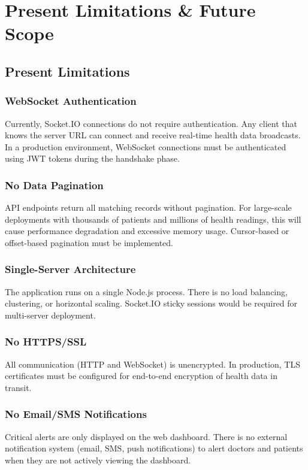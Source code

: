 \chapter{Present Limitations \& Future Scope}

\section{Present Limitations}

\subsection{WebSocket Authentication}
Currently, Socket.IO connections do not require authentication. Any client that knows the server URL can connect and receive real-time health data broadcasts. In a production environment, WebSocket connections must be authenticated using JWT tokens during the handshake phase.

\subsection{No Data Pagination}
API endpoints return all matching records without pagination. For large-scale deployments with thousands of patients and millions of health readings, this will cause performance degradation and excessive memory usage. Cursor-based or offset-based pagination must be implemented.

\subsection{Single-Server Architecture}
The application runs on a single Node.js process. There is no load balancing, clustering, or horizontal scaling. Socket.IO sticky sessions would be required for multi-server deployment.

\subsection{No HTTPS/SSL}
All communication (HTTP and WebSocket) is unencrypted. In production, TLS certificates must be configured for end-to-end encryption of health data in transit.

\subsection{No Email/SMS Notifications}
Critical alerts are only displayed on the web dashboard. There is no external notification system (email, SMS, push notifications) to alert doctors and patients when they are not actively viewing the dashboard.

